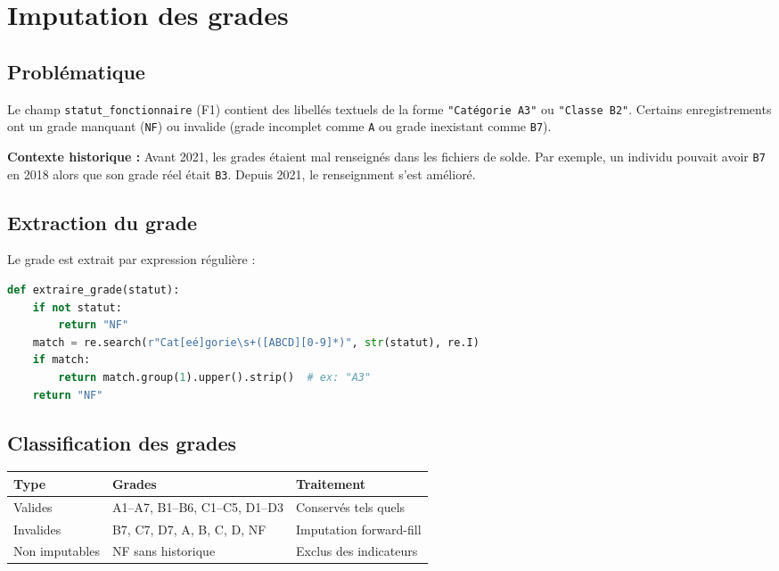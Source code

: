 \documentclass[12pt,a4paper,french]{article}
\newcommand{\colname}[1]{\texttt{#1}}
\begin{document}
\section{Imputation des grades}

\subsection{Problématique}

Le champ \colname{statut\_fonctionnaire} (F1) contient des libellés textuels
de la forme \texttt{"Catégorie A3"} ou \texttt{"Classe B2"}. Certains
enregistrements ont un grade manquant (\texttt{NF}) ou invalide (grade
incomplet comme \texttt{A} ou grade inexistant comme \texttt{B7}).

\textbf{Contexte historique :} Avant 2021, les grades étaient mal renseignés
dans les fichiers de solde. Par exemple, un individu pouvait avoir \texttt{B7}
en 2018 alors que son grade réel était \texttt{B3}. Depuis 2021, le
renseignment s'est amélioré.

\subsection{Extraction du grade}

Le grade est extrait par expression régulière :

\begin{lstlisting}[language=Python]
def extraire_grade(statut):
    if not statut:
        return "NF"
    match = re.search(r"Cat[eé]gorie\s+([ABCD][0-9]*)", str(statut), re.I)
    if match:
        return match.group(1).upper().strip()  # ex: "A3"
    return "NF"
\end{lstlisting}

\subsection{Classification des grades}

\begin{center}
\begin{tabular}{lll}
    \toprule
    \textbf{Type} & \textbf{Grades} & \textbf{Traitement} \\
    \midrule
    Valides & A1--A7, B1--B6, C1--C5, D1--D3 & Conservés tels quels \\
    Invalides & B7, C7, D7, A, B, C, D, NF & Imputation forward-fill \\
    Non imputables & NF sans historique & Exclus des indicateurs \\
    \bottomrule
\end{tabular}
\end{center}
\end{document}
